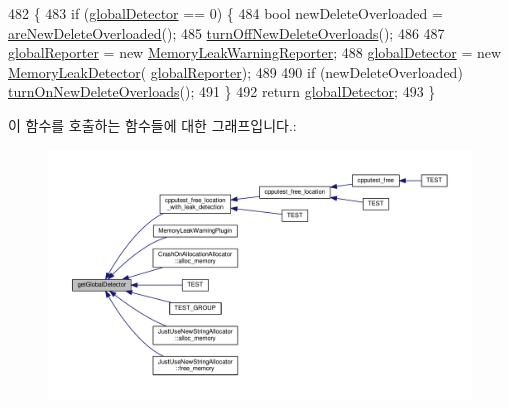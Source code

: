 \begin{DoxyCode}
482 \{
483     \textcolor{keywordflow}{if} (\hyperlink{_memory_leak_warning_plugin_8cpp_a683045477f23bad53a4b3ba10e29c002}{globalDetector} == 0) \{
484         \textcolor{keywordtype}{bool} newDeleteOverloaded = \hyperlink{class_memory_leak_warning_plugin_ac299937de1c7fe0649c5778c6063ed5a}{areNewDeleteOverloaded}();
485         \hyperlink{class_memory_leak_warning_plugin_a570ab0e6ae0556a885c5459e02318a18}{turnOffNewDeleteOverloads}();
486 
487         \hyperlink{_memory_leak_warning_plugin_8cpp_a49f30fa2e3b2703da2c79d49af91b4ba}{globalReporter} = \textcolor{keyword}{new} \hyperlink{class_memory_leak_warning_reporter}{MemoryLeakWarningReporter};
488         \hyperlink{_memory_leak_warning_plugin_8cpp_a683045477f23bad53a4b3ba10e29c002}{globalDetector} = \textcolor{keyword}{new} \hyperlink{class_memory_leak_detector}{MemoryLeakDetector}(
      \hyperlink{_memory_leak_warning_plugin_8cpp_a49f30fa2e3b2703da2c79d49af91b4ba}{globalReporter});
489 
490         \textcolor{keywordflow}{if} (newDeleteOverloaded) \hyperlink{class_memory_leak_warning_plugin_aaad06540a387a4e40670a6c6f988e94c}{turnOnNewDeleteOverloads}();
491     \}
492     \textcolor{keywordflow}{return} \hyperlink{_memory_leak_warning_plugin_8cpp_a683045477f23bad53a4b3ba10e29c002}{globalDetector};
493 \}
\end{DoxyCode}


이 함수를 호출하는 함수들에 대한 그래프입니다.\+:
\nopagebreak
\begin{figure}[H]
\begin{center}
\leavevmode
\includegraphics[width=350pt]{class_memory_leak_warning_plugin_abdb34ff63a853e006d310e0600d444f3_icgraph}
\end{center}
\end{figure}



